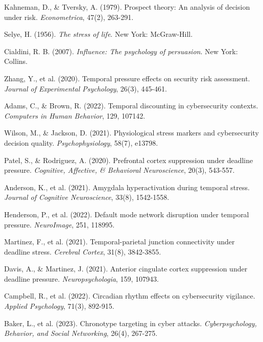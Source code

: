 \documentclass[11pt,a4paper]{article}
\begin{document}
\begin{thebibliography}{30}

Kahneman, D., \& Tversky, A. (1979). Prospect theory: An analysis of decision under risk. \textit{Econometrica}, 47(2), 263-291.

Selye, H. (1956). \textit{The stress of life}. New York: McGraw-Hill.

Cialdini, R. B. (2007). \textit{Influence: The psychology of persuasion}. New York: Collins.

Zhang, Y., et al. (2020). Temporal pressure effects on security risk assessment. \textit{Journal of Experimental Psychology}, 26(3), 445-461.

Adams, C., \& Brown, R. (2022). Temporal discounting in cybersecurity contexts. \textit{Computers in Human Behavior}, 129, 107142.

Wilson, M., \& Jackson, D. (2021). Physiological stress markers and cybersecurity decision quality. \textit{Psychophysiology}, 58(7), e13798.

Patel, S., \& Rodriguez, A. (2020). Prefrontal cortex suppression under deadline pressure. \textit{Cognitive, Affective, \& Behavioral Neuroscience}, 20(3), 543-557.

Anderson, K., et al. (2021). Amygdala hyperactivation during temporal stress. \textit{Journal of Cognitive Neuroscience}, 33(8), 1542-1558.

Henderson, P., et al. (2022). Default mode network disruption under temporal pressure. \textit{NeuroImage}, 251, 118995.

Martinez, F., et al. (2021). Temporal-parietal junction connectivity under deadline stress. \textit{Cerebral Cortex}, 31(8), 3842-3855.

Davis, A., \& Martinez, J. (2021). Anterior cingulate cortex suppression under deadline pressure. \textit{Neuropsychologia}, 159, 107943.

Campbell, R., et al. (2022). Circadian rhythm effects on cybersecurity vigilance. \textit{Applied Psychology}, 71(3), 892-915.

Baker, L., et al. (2023). Chronotype targeting in cyber attacks. \textit{Cyberpsychology, Behavior, and Social Networking}, 26(4), 267-275.


\end{thebibliography}
\end{document}
